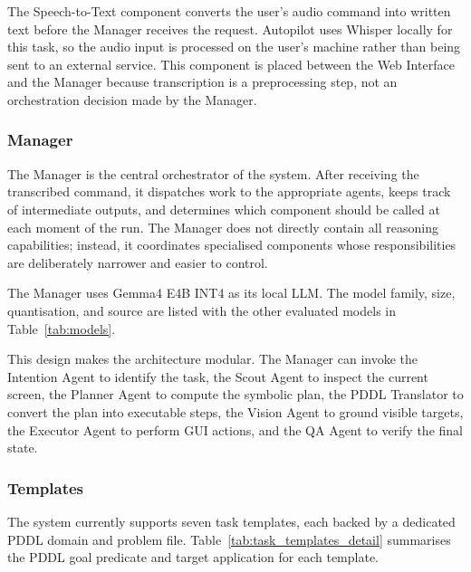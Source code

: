 The Speech-to-Text component converts the user's audio command into written text before the Manager receives the request. Autopilot uses Whisper locally for this task, so the audio input is processed on the user's machine rather than being sent to an external service. This component is placed between the Web Interface and the Manager because transcription is a preprocessing step, not an orchestration decision made by the Manager.

\subsubsection{Manager}

The Manager is the central orchestrator of the system. After receiving the transcribed command, it dispatches work to the appropriate agents, keeps track of intermediate outputs, and determines which component should be called at each moment of the run. The Manager does not directly contain all reasoning capabilities; instead, it coordinates specialised components whose responsibilities are deliberately narrower and easier to control.

The Manager uses Gemma4 E4B INT4 as its local LLM. The model family, size, quantisation, and source are listed with the other evaluated models in Table~\ref{tab:models}.

This design makes the architecture modular. The Manager can invoke the Intention Agent to identify the task, the Scout Agent to inspect the current screen, the Planner Agent to compute the symbolic plan, the PDDL Translator to convert the plan into executable steps, the Vision Agent to ground visible targets, the Executor Agent to perform GUI actions, and the QA Agent to verify the final state.

\subsubsection{Templates}

The system currently supports seven task templates, each backed by a dedicated PDDL domain and problem file. Table~\ref{tab:task_templates_detail} summarises the PDDL goal predicate and target application for each template.

